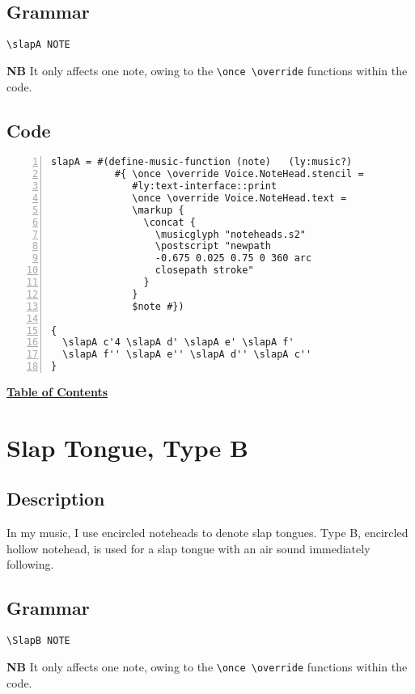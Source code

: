 \subsection{Grammar}
\begin{verbatim}
\slapA NOTE
\end{verbatim}
\textbf{NB} It only affects one note, owing to the \verb|\once \override| functions within the code.
\subsection{Code}
\begin{Verbatim}[numbers=left,xleftmargin=5mm]
slapA = #(define-music-function (note)   (ly:music?)
           #{ \once \override Voice.NoteHead.stencil =
              #ly:text-interface::print
              \once \override Voice.NoteHead.text =
              \markup {
                \concat {
                  \musicglyph "noteheads.s2"
                  \postscript "newpath 
                  -0.675 0.025 0.75 0 360 arc 
                  closepath stroke"
                }
              }
              $note #})

{
  \slapA c'4 \slapA d' \slapA e' \slapA f'
  \slapA f'' \slapA e'' \slapA d'' \slapA c''
}

\end{Verbatim} 
\hyperref[sec:toc]{\textbf{Table of Contents}}

\vfill \break


\section {Slap Tongue, Type B}
\hfill
\subsection{Description}
In my music, I use encircled noteheads to denote slap tongues. Type B, encircled hollow notehead, is used for a slap tongue with an air sound immediately following.  

\subsection{Grammar}
\begin{verbatim}
\SlapB NOTE
\end{verbatim}
\textbf{NB} It only affects one note, owing to the \verb|\once \override| functions within the code.
